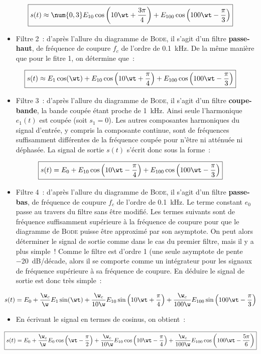 \documentclass[../TDE8_filtrage.tex]{subfiles}%
\begin{document}
{\[\boxed{
	s(t) \approx
	\num{0,3}E_{10} \cos \left(10\wt + \frac{3\pi}{4}\right) +
	E_{100} \cos \left(100\wt - \frac{\pi}{3}\right)
	}\]

\begin{itemize}
	\item Filtre 2~: d'après l'allure du diagramme de \textsc{Bode}, il s'agit d'un
	      filtre \textbf{passe-haut}, de fréquence de coupure $f_c$ de l'ordre de
	      \SI{0.1}{kHz}. De la même manière que pour le fitre 1, on détermine que~:
\end{itemize}

\[\boxed{
		s(t) \approx
		E_1 \cos (\wt) + E_{10} \cos \left(10\wt + \frac{\pi}{4}\right) +
		E_{100} \cos \left(100\wt - \frac{\pi}{3}\right)
	}\]
\begin{itemize}
	\item Filtre 3~: d'après l'allure du diagramme de \textsc{Bode}, il s'agit d'un
	      filtre \textbf{coupe-bande}, la bande coupée étant proche de
	      \SI{1}{kHz}. Ainsi seule l'harmonique $e_1(t)$ est coupée (soit $s_1 =
		      0$). Les autres composantes harmoniques du signal d'entrée, y compris la
	      composante continue, sont de fréquences suffisamment différentes de la
	      fréquence coupée pour n'être ni atténuée ni déphasée. La signal de
	      sortie $s(t)$ s'écrit donc sous la forme~:
\end{itemize}

\[\boxed{
		s(t) =
		E_0 +
		E_{10} \cos \left(10\wt - \frac{\pi}{4}\right) +
		E_{100} \cos \left(100\wt - \frac{\pi}{3}\right)
	}\]
\begin{itemize}
	\item Filtre 4~: d'après l'allure du diagramme de \textsc{Bode}, il s'agit
	      d'un filtre \textbf{passe-bas}, de fréquence de coupure $f_c$ de l'ordre
	      de \SI{0.1}{kHz}. Le terme constant $e_0$ passe au travers du filtre
	      sans être modifié. Les termes suivants sont de fréquence suffisamment
	      supérieure à la fréquence de coupure pour que le diagramme de
	      \textsc{Bode} puisse être approximé par son asymptote. On peut alors
	      déterminer le signal de sortie comme dans le cas du premier filtre, mais
	      il y a plus simple~! Comme le filtre est d'ordre 1 (une seule asymptote
	      de pente \SI{-20}{dB/décade}, alors il se comporte comme un intégrateur
	      pour les signaux de fréquence supérieure à sa fréquence de coupure. En
	      déduire le signal de sortie est donc très simple~:
\end{itemize}

\[s(t) =
	E_0 +
	\frac{\w_c}{\w}E_1\sin(\wt) +
	\frac{\w_c}{10\w}E_{10}\sin \left( 10\wt + \frac{\pi}{4} \right) +
	\frac{\w_c}{100\w}E_{100}\sin \left( 100\wt - \frac{\pi}{3} \right)
\]
\begin{itemize}
	\item{}
	      En écrivant le signal en termes de cosinus, on obtient~:
\end{itemize}
\[\boxed{
	s(t) =
	E_0 +
	\frac{\w_c}{\w}E_0\cos\left(\wt - \frac{\pi}{2}\right) +
	\frac{\w_c}{10\w}E_{10}\cos \left( 10\wt - \frac{\pi}{4} \right) +
	\frac{\w_c}{100\w}E_{100}\cos \left( 100\wt - \frac{5\pi}{6} \right)
	}\]
}
\end{document}
